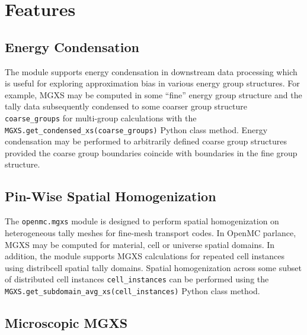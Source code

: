 \section{Features}
\label{sec:features}


\subsection{Energy Condensation}
\label{subsec:energy-condense}

The module supports energy condensation in downstream data processing which is useful for exploring approximation bias in various energy group structures. For example, MGXS may be computed in some ``fine'' energy group structure and the tally data subsequently condensed to some coarser group structure \texttt{coarse_groups} for multi-group calculations with the \texttt{MGXS.get_condensed_xs(coarse_groups)} Python class method. Energy condensation may be performed to arbitrarily defined coarse group structures provided the coarse group boundaries coincide with boundaries in the fine group structure.


\subsection{Pin-Wise Spatial Homogenization}
\label{subsec:pinwise-homogenize}

The \texttt{openmc.mgxs} module is designed to perform spatial homogenization on heterogeneous tally meshes for fine-mesh transport codes. In OpenMC parlance, MGXS may be computed for material, cell or universe spatial domains. In addition, the module supports MGXS calculations for repeated cell instances using distribcell spatial tally domains\cite{lax2014distribcell}. Spatial homogenization across some subset of distributed cell instances \texttt{cell_instances} can be performed using the \texttt{MGXS.get_subdomain_avg_xs(cell_instances)} Python class method.



\subsection{Microscopic MGXS}
\label{subsec:micro-macro}

